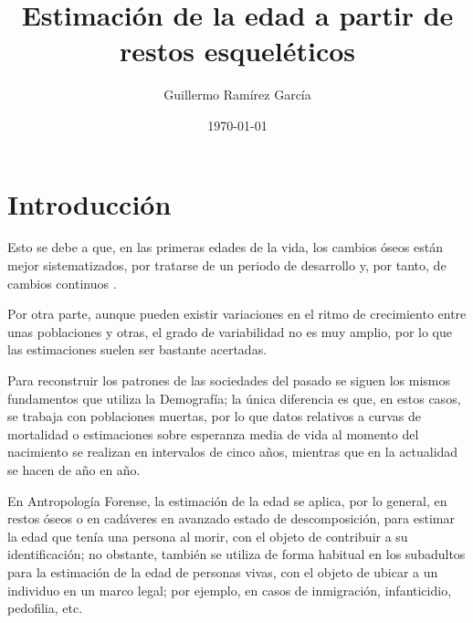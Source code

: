 \documentclass[a4paper,11pt]{article}
\begin{document}
\title{\Huge Estimación de la edad a partir de restos esqueléticos}
\author{Guillermo Ramírez García}
\date{\today}
\maketitle
\newpage
{}
\part{Introducción}
Esto se debe a que, en las primeras edades de la vida, los cambios óseos están mejor sistematizados, por tratarse de un periodo de desarrollo y, por tanto, de cambios continuos \cite{scheuer2004juvenile}.

Por otra parte, aunque pueden existir variaciones en el ritmo de crecimiento entre unas poblaciones y otras, el grado de variabilidad no es muy amplio, por lo que las estimaciones suelen ser bastante acertadas.

Para reconstruir los patrones de las sociedades del pasado se siguen los mismos fundamentos que utiliza la Demografía; la única diferencia es que, en estos casos, se trabaja con poblaciones muertas, por lo que datos relativos a curvas de mortalidad o estimaciones sobre esperanza media de vida al momento del nacimiento se realizan en intervalos de cinco años, mientras que en la actualidad se hacen de año en año.

En Antropología Forense, la estimación de la edad se aplica, por lo general, en restos óseos o en cadáveres en avanzado estado de descomposición, para estimar la edad que tenía una persona al morir, con el objeto de contribuir a su identificación; no obstante, también se utiliza de forma habitual en los subadultos para la estimación de la edad de personas vivas, con el objeto de ubicar a un individuo en un marco legal; por ejemplo, en casos de inmigración, infanticidio, pedofilia, etc.
            
\end{document}
